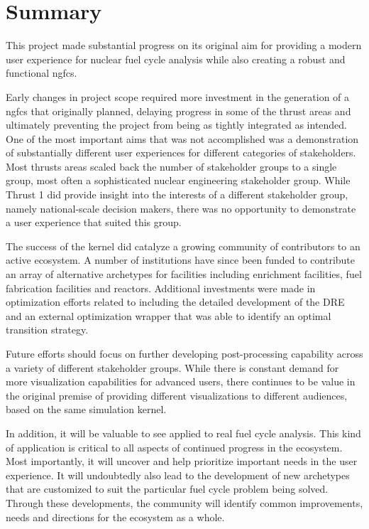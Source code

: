 \chapter{Summary}

This project made substantial progress on its original aim for providing a
modern user experience for nuclear fuel cycle analysis while also creating a
robust and functional \acrfull{ngfcs}.

Early changes in project scope required more investment in the generation of a
\gls{ngfcs} that originally planned, delaying progress in some of the thrust
areas and ultimately preventing the project from being as tightly integrated
as intended.  One of the most important aims that was not accomplished was a
demonstration of substantially different user experiences for different
categories of stakeholders.  Most thrusts areas scaled back the number of
stakeholder groups to a single group, most often a sophisticated nuclear
engineering stakeholder group.  While Thrust 1 did provide insight into the
interests of a different stakeholder group, namely national-scale decision
makers, there was no opportunity to demonstrate a user experience that suited
this group.

The success of the \Cyclus kernel did catalyze a growing community of
contributors to an active ecosystem.  A number of institutions have since been
funded to contribute an array of alternative archetypes for facilities
including enrichment facilities, fuel fabrication facilities and reactors.
Additional investments were made in optimization efforts related to \Cyclus
including the detailed development of the \acrfull{DRE} and an external
optimization wrapper that was able to identify an optimal transition strategy.

Future efforts should focus on further developing post-processing capability
across a variety of different stakeholder groups.  While there is constant
demand for more visualization capabilities for advanced users, there continues
to be value in the original premise of providing different visualizations to
different audiences, based on the same simulation kernel.

In addition, it will be valuable to see \Cyclus applied to real fuel cycle
analysis.  This kind of application is critical to all aspects of continued
progress in the \Cyclus ecosystem.  Most importantly, it will uncover and help
prioritize important needs in the user experience.  It will undoubtedly also
lead to the development of new archetypes that are customized to suit the
particular fuel cycle problem being solved.  Through these developments, the
community will identify common improvements, needs and directions for the
ecosystem as a whole.
